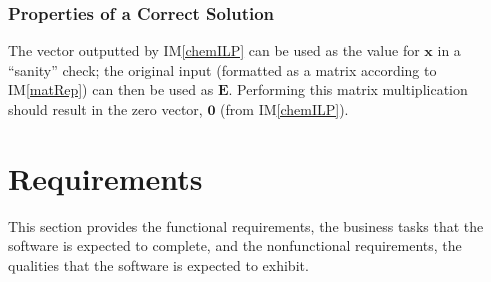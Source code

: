 \documentclass[12pt]{article}
\newcommand{\ddref}[1]{DD\ref{#1}}
\newcommand{\aref}[1]{A\ref{#1}}
\newcommand{\imref}[1]{IM\ref{#1}}
\begin{document}
\subsubsection{Properties of a Correct Solution} \label{sec_PropsCorrSol}

The vector outputted by \imref{chemILP} can be used as the value for
$\textbf{x}$ in a ``sanity'' check; the original input (formatted as a matrix
according to \imref{matRep}) can then be used as $\textbf{E}$.
Performing this matrix multiplication should result in the zero vector,
$\textbf{0}$ (from \imref{chemILP}).




\newpage

\section{Requirements}
This section provides the functional requirements, the business tasks that the
software is expected to complete, and the nonfunctional requirements, the
qualities that the software is expected to exhibit.
\end{document}
